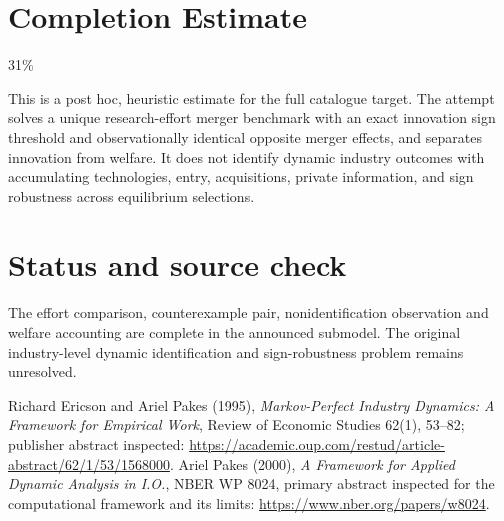 \documentclass[11pt]{article}
\begin{document}
\section{Completion Estimate}
31\%

This is a post hoc, heuristic estimate for the full catalogue target.
The attempt solves a unique research-effort merger benchmark with an exact innovation sign threshold and observationally identical opposite merger effects, and separates innovation from welfare. It does not identify dynamic industry outcomes with accumulating technologies, entry, acquisitions, private information, and sign robustness across equilibrium selections.

\section{Status and source check}
The effort comparison, counterexample pair, nonidentification observation and welfare accounting are complete in the announced submodel. The original industry-level dynamic identification and sign-robustness problem remains unresolved.

Richard Ericson and Ariel Pakes (1995), \emph{Markov-Perfect Industry Dynamics: A Framework for Empirical Work}, Review of Economic Studies 62(1), 53--82; publisher abstract inspected:
\url{https://academic.oup.com/restud/article-abstract/62/1/53/1568000}.
Ariel Pakes (2000), \emph{A Framework for Applied Dynamic Analysis in I.O.}, NBER WP 8024, primary abstract inspected for the computational framework and its limits:
\url{https://www.nber.org/papers/w8024}.
\end{document}
